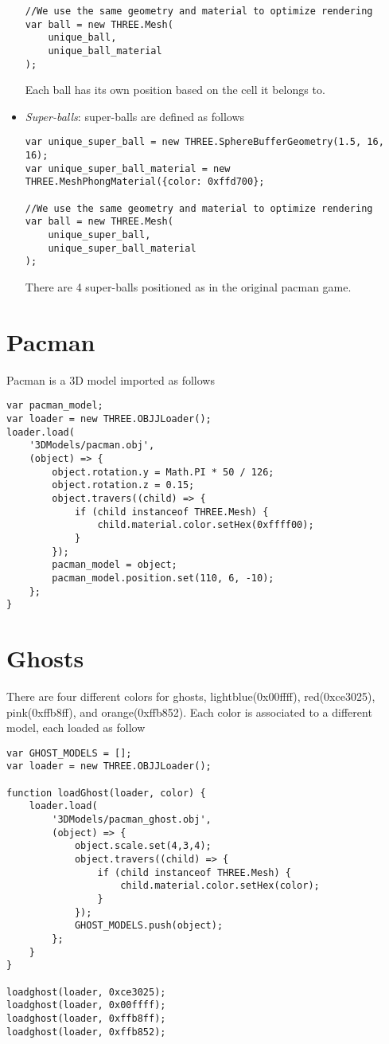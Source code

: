 \documentclass[a4paper,oneside]{report}
\begin{document}
\begin{itemize}
\begin{lstlisting}
//We use the same geometry and material to optimize rendering
var	ball = new THREE.Mesh(
	unique_ball,
	unique_ball_material
);
\end{lstlisting}
Each ball has its own position based on the cell it belongs to.
\item \textit{Super-balls}: super-balls are defined as follows
\begin{lstlisting}
var unique_super_ball = new THREE.SphereBufferGeometry(1.5, 16, 16);
var unique_super_ball_material = new THREE.MeshPhongMaterial({color: 0xffd700};

//We use the same geometry and material to optimize rendering
var	ball = new THREE.Mesh(
	unique_super_ball,
	unique_super_ball_material
);
\end{lstlisting}
There are 4 super-balls positioned as in the original pacman game.
\end{itemize}

\section{Pacman}
Pacman is a 3D model imported as follows
\begin{lstlisting}
var pacman_model;
var loader = new THREE.OBJJLoader();
loader.load(
	'3DModels/pacman.obj',
	(object) => {
		object.rotation.y = Math.PI * 50 / 126;
		object.rotation.z = 0.15;
		object.travers((child) => {
			if (child instanceof THREE.Mesh) {
				child.material.color.setHex(0xffff00);
			}
		});
		pacman_model = object;
		pacman_model.position.set(110, 6, -10);
	};
}
\end{lstlisting}

\section{Ghosts}
There are four different colors for ghosts, light\textunderscore blue(0x00ffff), red(0xce3025), pink(0xffb8ff), and orange(0xffb852). Each color is associated to a different model, each loaded as follow
\begin{lstlisting}
var GHOST_MODELS = [];
var loader = new THREE.OBJJLoader();

function loadGhost(loader, color) {
	loader.load(
		'3DModels/pacman_ghost.obj',
		(object) => {
			object.scale.set(4,3,4);
			object.travers((child) => {
				if (child instanceof THREE.Mesh) {
					child.material.color.setHex(color);
				}
			});
			GHOST_MODELS.push(object);
		};
	}
}

loadghost(loader, 0xce3025);
loadghost(loader, 0x00ffff);
loadghost(loader, 0xffb8ff);
loadghost(loader, 0xffb852);
\end{lstlisting}
\end{document}
